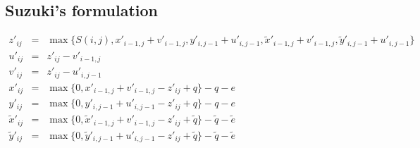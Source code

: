 \documentclass[10pt]{article}
\begin{document}
\subsection{Suzuki's formulation}

\begin{eqnarray*}
z'_{ij}&=&\max\{S(i,j),x'_{i-1,j}+v'_{i-1,j},y'_{i,j-1}+u'_{i,j-1},\tilde{x}'_{i-1,j}+v'_{i-1,j},\tilde{y}'_{i,j-1}+u'_{i,j-1}\}\\
u'_{ij}&=&z'_{ij}-v'_{i-1,j}\\
v'_{ij}&=&z'_{ij}-u'_{i,j-1}\\
x'_{ij}&=&\max\{0,x'_{i-1,j}+v'_{i-1,j}-z'_{ij}+q\}-q-e\\
y'_{ij}&=&\max\{0,y'_{i,j-1}+u'_{i,j-1}-z'_{ij}+q\}-q-e\\
\tilde{x}'_{ij}&=&\max\{0,\tilde{x}'_{i-1,j}+v'_{i-1,j}-z'_{ij}+\tilde{q}\}-\tilde{q}-\tilde{e}\\
\tilde{y}'_{ij}&=&\max\{0,\tilde{y}'_{i,j-1}+u'_{i,j-1}-z'_{ij}+\tilde{q}\}-\tilde{q}-\tilde{e}
\end{eqnarray*}
\end{document}
